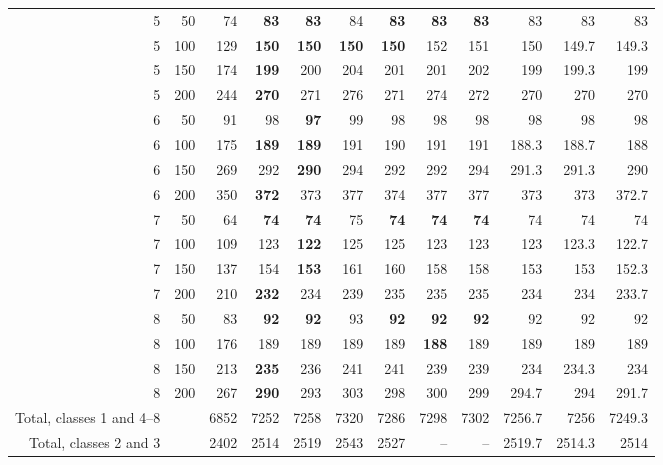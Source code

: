 \begin{table}[htbp]
\begin{tabular}{@{}rrrrrrrrrrrr@{}}
5 & 50 & 74 & \textbf{83} & \textbf{83} & 84 & \textbf{83} & \textbf{83} & \textbf{83} & 83 & 83 & 83 \\
5 & 100 & 129 & \textbf{150} & \textbf{150} & \textbf{150} & \textbf{150} & 152 & 151 & 150 & 149.7 & 149.3 \\
5 & 150 & 174 & \textbf{199} & 200 & 204 & 201 & 201 & 202 & 199 & 199.3 & 199 \\
5 & 200 & 244 & \textbf{270} & 271 & 276 & 271 & 274 & 272 & 270 & 270 & 270 \\
6 & 50 & 91 & 98 & \textbf{97} & 99 & 98 & 98 & 98 & 98 & 98 & 98 \\
6 & 100 & 175 & \textbf{189} & \textbf{189} & 191 & 190 & 191 & 191 & 188.3 & 188.7 & 188 \\
6 & 150 & 269 & 292 & \textbf{290} & 294 & 292 & 292 & 294 & 291.3 & 291.3 & 290 \\
6 & 200 & 350 & \textbf{372} & 373 & 377 & 374 & 377 & 377 & 373 & 373 & 372.7 \\
7 & 50 & 64 & \textbf{74} & \textbf{74} & 75 & \textbf{74} & \textbf{74} & \textbf{74} & 74 & 74 & 74 \\
7 & 100 & 109 & 123 & \textbf{122} & 125 & 125 & 123 & 123 & 123 & 123.3 & 122.7 \\
7 & 150 & 137 & 154 & \textbf{153} & 161 & 160 & 158 & 158 & 153 & 153 & 152.3 \\
7 & 200 & 210 & \textbf{232} & 234 & 239 & 235 & 235 & 235 & 234 & 234 & 233.7 \\
8 & 50 & 83 & \textbf{92} & \textbf{92} & 93 & \textbf{92} & \textbf{92} & \textbf{92} & 92 & 92 & 92 \\
8 & 100 & 176 & 189 & 189 & 189 & 189 & \textbf{188} & 189 & 189 & 189 & 189 \\
8 & 150 & 213 & \textbf{235} & 236 & 241 & 241 & 239 & 239 & 234 & 234.3 & 234 \\
8 & 200 & 267 & \textbf{290} & 293 & 303 & 298 & 300 & 299 & 294.7 & 294 & 291.7 \\
\midrule
Total, classes 1 and 4--8 &  & 6852 & 7252 & 7258 & 7320 & 7286 & 7298 & 7302 & 7256.7 & 7256 & 7249.3 \\
Total, classes 2 and 3 &  & 2402 & 2514 & 2519 & 2543 & 2527 & -- & -- & 2519.7 & 2514.3 & 2514 \\
\bottomrule
\end{tabular}
\end{table}
